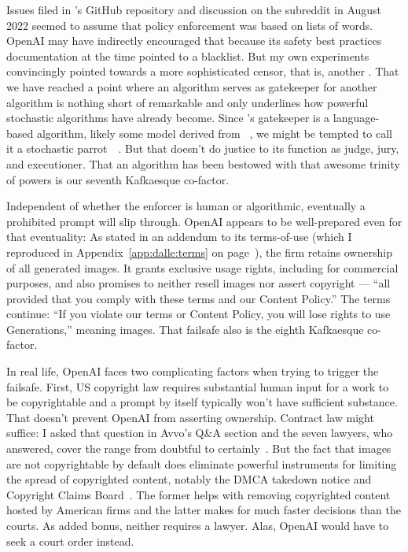 Issues filed in \DALLE's GitHub repository and discussion on the subreddit in
August 2022 seemed to assume that policy enforcement was based on lists of
words. OpenAI may have indirectly encouraged that because its safety best
practices documentation at the time pointed to a  blacklist. But my own
experiments convincingly pointed towards a more sophisticated censor, that is,
another \AI. That we have reached a point where an algorithm serves as
gatekeeper for another algorithm is nothing short of remarkable and only
underlines how powerful stochastic algorithms have already become. Since
\DALLE's gatekeeper is a language-based algorithm, likely some model derived
from \GPT~\cite{BrownMannea2020}, we might be tempted to call it a stochastic
parrot~~\cite{BenderGebruea2021}. But that doesn't do justice to
its function as judge, jury, and executioner. That an algorithm has been
bestowed with that awesome trinity of powers is our seventh Kafkaesque
co-factor.

Independent of whether the enforcer is human or algorithmic, eventually a
prohibited prompt will slip through. OpenAI appears to be well-prepared even for
that eventuality: As stated in an addendum to its terms-of-use (which I
reproduced in Appendix~\ref{app:dalle:terms} on
page~\pageref{app:dalle:terms}), the firm retains ownership of all generated
images. It grants exclusive usage rights, including for commercial purposes, and
also promises to neither resell images nor assert copyright — ``all provided
that you comply with these terms and our Content Policy.'' The terms continue:
``If you violate our terms or Content Policy, you will lose rights to use
Generations,'' meaning images. That failsafe also is the eighth Kafkaesque
co-factor.

In real life, OpenAI faces two complicating factors when trying to trigger the
failsafe. First, US copyright law requires substantial human input for a work to
be copyrightable and a prompt by itself typically won't have sufficient
substance. That doesn't prevent OpenAI from asserting ownership. Contract law
might suffice: I asked that question in Avvo's Q\&A section and the seven
lawyers, who answered, cover the range from doubtful to
certainly~\cite{Grimm2023}. But the fact that images are not copyrightable by
default does eliminate powerful instruments for limiting the spread of
copyrighted content, notably the DMCA takedown notice and Copyright Claims
Board~\cite{CCB2022}. The former helps with removing copyrighted content hosted
by American firms and the latter makes for much faster decisions than the
courts. As added bonus, neither requires a lawyer. Alas, OpenAI would have to
seek a court order instead.

